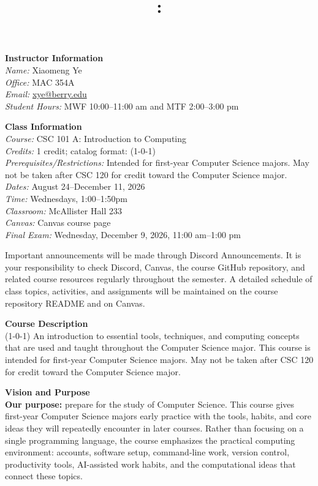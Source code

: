 \documentclass[11pt,letterpaper]{article}
\title{\Large\bfseries \coursecode: \coursetitle\\[0.1cm] \semester}
\author{}
\date{}
\makeatletter
\newcommand{\lefthead}[2]{\noindent\textbf{#1}\hfill\\[#2]}
\newcommand{\blankline}{\par\vspace{0.3cm}}
\newcommand{\coursename}{CSC 101 A: Introduction to Computing}
\newcommand{\instructor}{Xiaomeng Ye}
\newcommand{\office}{MAC 354A}
\newcommand{\email}{xye@berry.edu}
\newcommand{\officehours}{MWF 10:00--11:00 am and MTF 2:00--3:00 pm}
\newcommand{\classdates}{August 24--December 11, 2026}
\newcommand{\classtime}{Wednesdays, 1:00--1:50pm}
\newcommand{\classroom}{McAllister Hall 233}
\newcommand{\credits}{1 credit; catalog format: (1-0-1)}
\newcommand{\prerequisites}{Intended for first-year Computer Science majors. May not be taken after CSC 120 for credit toward the Computer Science major.}
\newcommand{\finalexam}{Wednesday, December 9, 2026, 11:00 am--1:00 pm}
\newcommand{\canvaslink}{Canvas course page}
\newcommand{\communication}{Discord Announcements}
\makeatother
\begin{document}
\maketitle
\thispagestyle{empty}
\vspace{-2cm}

\lefthead{Instructor Information}{0.3cm}
\indent \emph{Name:} \instructor \\
\indent \emph{Office:} \office \\
\indent \emph{Email:} \href{mailto:xye@berry.edu}{\email} \\
\indent \emph{Student Hours:} \officehours
\blankline

\lefthead{Class Information}{0.3cm}
\indent \emph{Course:} \coursename \\
\indent \emph{Credits:} \credits \\
\indent \emph{Prerequisites/Restrictions:} \prerequisites \\
\indent \emph{Dates:} \classdates \\
\indent \emph{Time:} \classtime \\
\indent \emph{Classroom:} \classroom \\
\indent \emph{Canvas:} \canvaslink \\
\indent \emph{Final Exam:} \finalexam
\blankline

Important announcements will be made through \communication. It is your responsibility to check Discord, Canvas, the course GitHub repository, and related course resources regularly throughout the semester. A detailed schedule of class topics, activities, and assignments will be maintained on the course repository README and on Canvas.
\blankline

\lefthead{Course Description}{0.3cm}
(1-0-1) An introduction to essential tools, techniques, and computing concepts that are used and taught throughout the Computer Science major. This course is intended for first-year Computer Science majors. May not be taken after CSC 120 for credit toward the Computer Science major.
\blankline

\lefthead{Vision and Purpose}{0.3cm}
\textbf{Our purpose:} prepare for the study of Computer Science. This course gives first-year Computer Science majors early practice with the tools, habits, and core ideas they will repeatedly encounter in later courses. Rather than focusing on a single programming language, the course emphasizes the practical computing environment: accounts, software setup, command-line work, version control, productivity tools, AI-assisted work habits, and the computational ideas that connect these topics.
\blankline
\end{document}
